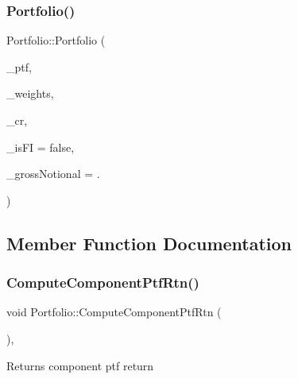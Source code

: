\subsubsection{\texorpdfstring{Portfolio()}{Portfolio()}}
{\footnotesize\ttfamily Portfolio\+::\+Portfolio (\begin{DoxyParamCaption}\item[{const \hyperlink{portfolio_8h_ab6c2cd0942dd9f72ca64d9dbadb0df64}{Ptf} \&}]{\+\_\+ptf,  }\item[{const \hyperlink{compute__returns__eigen_8h_a1eb6a9306ef406d7975f3cbf2e247777}{Vec} \&}]{\+\_\+weights,  }\item[{shared\+\_\+ptr$<$ \hyperlink{classComputeReturn}{Compute\+Return} $>$ \&}]{\+\_\+cr,  }\item[{bool}]{\+\_\+is\+FI = {\ttfamily false},  }\item[{double}]{\+\_\+gross\+Notional = {.} }\end{DoxyParamCaption})}



\subsection{Member Function Documentation}
\hypertarget{classPortfolio_a2824877890ad51d9261935002a6d25c0}{}\label{classPortfolio_a2824877890ad51d9261935002a6d25c0} 
\subsubsection{\texorpdfstring{Compute\+Component\+Ptf\+Rtn()}{ComputeComponentPtfRtn()}}
{\footnotesize\ttfamily void Portfolio\+::\+Compute\+Component\+Ptf\+Rtn (\begin{DoxyParamCaption}{ }\end{DoxyParamCaption})\hspace{0.3cm}{\ttfamily [inline]}, {\ttfamily [protected]}}

\begin{DoxyReturn}{Returns}
component ptf return 
\end{DoxyReturn}
\hypertarget{classPortfolio_ad2732b083b90ecd08e5bf26fb38a1834}{}\label{classPortfolio_ad2732b083b90ecd08e5bf26fb38a1834} 
